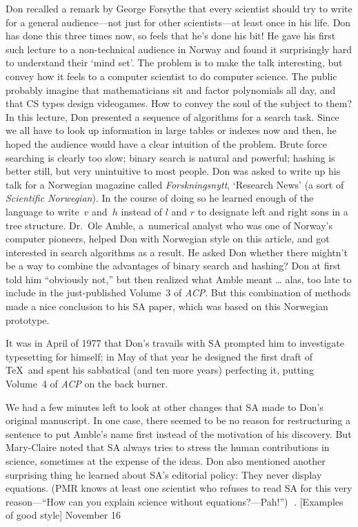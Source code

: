 Don recalled a remark by George Forsythe  that every scientist should
try to write for a general audience---not just for other scientists---at
 least once in his life. Don has done this three times now, so feels
that he's done his bit! He gave his first such lecture to a
non-technical audience in Norway and found it surprisingly hard to
understand their `mind set'. The problem is to make the talk
interesting, but convey how it feels to a computer scientist to do
computer science. The public probably imagine that mathematicians sit
and factor polynomials all day, and that CS types design videogames.
How to convey the soul of the subject to them? 
In this lecture, Don presented a
sequence of algorithms for a search task. Since we all have to look up
information in large tables or indexes now and then, he hoped the
audience would have a clear intuition of the problem.  Brute force
searching is clearly too slow; binary search is natural and powerful;
hashing is better still, but very unintuitive to most people. Don was
asked to write up his talk for a Norwegian magazine called
{\sl Forskningsnytt}, 
`Research News' (a sort of {\sl
Scientific Norwegian}). In the course of doing so he learned enough of
the language to write~$v$ and~$h$ instead of $l$ and $r$ to designate
left and right sons in a tree structure. 
Dr.~Ole Amble, a~numerical analyst who was one of Norway's
computer pioneers, helped Don with Norwegian style on this
article, and got interested in search algorithms as a result. He 
asked Don whether there mightn't be a way to combine the advantages of
binary search and hashing? Don at first 
told him ``obviously not,'' but then realized what Amble meant \dots
alas, too late to include in the just-published Volume~3
of {\sl ACP}. But this combination of methods made a nice conclusion
to his SA paper, which was based on this Norwegian prototype.

It was in April of 1977 that Don's travails with SA prompted him
to investigate typesetting for himself; in May of that year he
designed the first draft of \TeX\ and spent his sabbatical 
(and ten more years) perfecting
it, putting Volume~4 of {\sl ACP\/} on the back burner.

We had a few minutes left to look at other changes that
SA made to Don's original manuscript. In one case, there
seemed to be no reason for restructuring a sentence to put Amble's
name first instead of the motivation of his discovery. But
Mary-Claire noted that SA always tries 
 to stress the human contributions in 
science, sometimes at the expense of the ideas. 
Don also mentioned another surprising thing he learned about SA's
editorial policy: They never
display equations. (PMR knows at least one scientist who refuses to
read SA for this very reason---``How can you explain science without
equations?---Pah!'')
. [Examples of good style] \tll November 16

